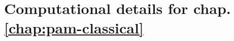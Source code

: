 \chapter{Computational details for chap. \ref{chap:pam-classical}}
\label{ap:a}
\label{ap:a-computational}